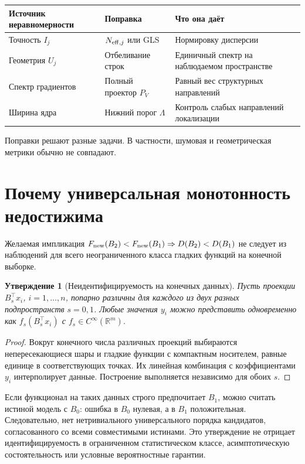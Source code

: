 \documentclass[11pt,a4paper]{article}
\newcommand{\R}{\mathbb R}
\newtheorem{proposition}{Утверждение}
\begin{document}
\begin{center}\small
\begin{tabularx}{\linewidth}{@{}lXX@{}}
\toprule
Источник неравномерности & Поправка & Что она даёт \\
\midrule
Точность $I_j$ & $N_{{\rm eff},j}$ или GLS & Нормировку дисперсии \\
Геометрия $U_j$ & Отбеливание строк & Единичный спектр на наблюдаемом пространстве \\
Спектр градиентов & Полный проектор $P_V$ & Равный вес структурных направлений \\
Ширина ядра & Нижний порог $\Lambda$ & Контроль слабых направлений локализации \\
\bottomrule
\end{tabularx}
\end{center}
Поправки решают разные задачи. В частности, шумовая и геометрическая
метрики обычно не совпадают.

\section{Почему универсальная монотонность недостижима}
Желаемая импликация $F_{\rm new}(B_2)<F_{\rm new}(B_1)\Rightarrow
D(B_2)<D(B_1)$ не следует из наблюдений для всего неограниченного класса
гладких функций на конечной выборке.

\begin{proposition}[Неидентифицируемость на конечных данных]
Пусть проекции $B_s^\top x_i$, $i=1,\ldots,n$, попарно различны
для каждого из двух разных подпространств $s=0,1$. Любые значения $y_i$
можно представить одновременно как $f_s(B_s^\top x_i)$ с
$f_s\in C^\infty(\R^m)$.
\end{proposition}
\begin{proof}
Вокруг конечного числа различных проекций выбираются непересекающиеся
шары и гладкие функции с компактным носителем, равные единице в
соответствующих точках. Их линейная комбинация с коэффициентами $y_i$
интерполирует данные. Построение выполняется независимо для обоих $s$.
\end{proof}
Если функционал на таких данных строго предпочитает $B_1$, можно считать
истиной модель с $B_0$: ошибка в $B_0$ нулевая, а в $B_1$ положительная.
Следовательно, нет нетривиального универсального порядка кандидатов,
согласованного со всеми совместимыми истинами. Это утверждение не
отрицает идентифицируемость в ограниченном статистическом классе,
асимптотическую состоятельность или условные вероятностные гарантии.
\end{document}
